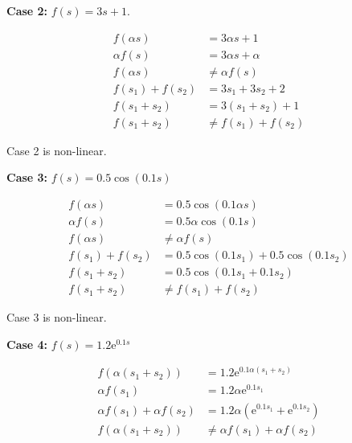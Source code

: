 \textbf{Case 2:} $f(s) = 3s + 1$.

\begin{equation*}
 \begin{split}
  f(\alpha s) & = 3 \alpha  s +1\\
  \alpha f(s) & = 3 \alpha s + \alpha\\
  f(\alpha s) & \neq \alpha f(s)\\
  f(s_1) + f(s_2) & = 3 s_1 + 3 s_2 + 2\\
  f(s_1 + s_2) & = 3 (s_1+s_2) + 1\\
  f(s_1 +s_2) & \neq f(s_1) + f(s_2)
 \end{split}
\end{equation*}


Case 2 is non-linear.


\textbf{Case 3:} $f(s) = 0.5 \cos (0.1 s) $

\begin{equation*}
 \begin{split}
  f(\alpha s) & = 0.5 \cos (0.1 \alpha s)\\
  \alpha f(s) & = 0.5 \alpha \cos (0.1 s)\\
  f(\alpha s) & \neq \alpha f(s)\\
  f(s_1) + f(s_2) & = 0.5 \cos (0.1 s_1) + 0.5 \cos (0.1 
s_2) \\
  f(s_1 + s_2) & = 0.5 \cos (0.1 s_1 + 0.1 s_2)\\
  f(s_1 + s_2) & \neq f(s_1) + f(s_2)
 \end{split}
\end{equation*}


Case 3 is non-linear.


\textbf{Case 4:} $f(s) = 1.2 \mathrm{e}^{0.1 s}$

\begin{equation*}
 \begin{split}
f(\alpha (s_1+s_2))  & = 1.2 \mathrm{e}^{0.1 \alpha (s_1 + 
s_2)}\\
\alpha f(s_1) & = 1.2 \alpha \mathrm{e}^{0.1 s_1}\\
\alpha f(s_1) + \alpha f(s_2) & = 1.2 \alpha 
(\mathrm{e}^{0.1 s_1} + \mathrm{e}^{0.1 s_2})\\
f(\alpha (s_1+s_2))  & \neq \alpha f(s_1) + \alpha f(s_2)
 \end{split}
\end{equation*}


